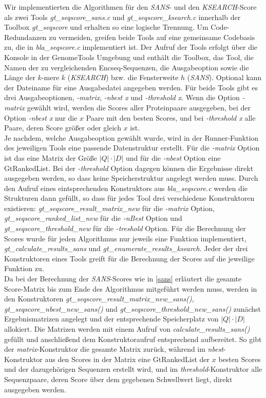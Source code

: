 \documentclass{article}
\begin{document}
Wir implementierten die Algorithmen für den \emph{SANS}- und den \emph{KSEARCH}-Score als zwei Tools \emph{gt\_seqscore\_sans.c} und \emph{gt\_seqscore\_ksearch.c} innerhalb der Toolbox \emph{gt\_seqscore} und erhalten so eine logische Trennung. Um Code-Redundanzen zu vermeiden, greifen beide Tools auf eine gemeinsame Codebasis zu, die in \emph{bla\_seqscore.c} implementiert ist. 
Der Aufruf der Tools erfolgt über die Konsole in der GenomeTools Umgebung und enthält die Toolbox, das Tool, die Namen der zu vergleichenden Encseq-Sequenzen, die 
Ausgabeoption sowie die Länge der $k$-mere $k$ (\emph{KSEARCH}) bzw. die Fensterweite $h$ (\emph{SANS}). Optional kann der Dateiname für eine Ausgabedatei angegeben werden.
Für beide Tools gibt es drei Ausgabeoptionen, \emph{-matrix}, \emph{-nbest x} und \emph{-threshold x}. Wenn die Option \emph{-matrix} gewählt wird, werden die Scores aller Proteinpaare ausgegeben, 
bei der Option \emph{-nbest x} nur die $x$ Paare mit den besten Scores, und bei \emph{-threshold x} alle Paare, deren Score größer oder gleich $x$ ist. \\
Je nachdem, welche Ausgabeoption gewählt wurde, wird in der Runner-Funktion des jeweiligen Tools eine passende Datenstruktur erstellt. 
Für die \emph{-matrix} Option ist das eine Matrix der Größe $|Q|\cdot|D|$ und für die \emph{-nbest} Option eine GtRankedList. 
Bei der \emph{-threshold} Option dagegen können die Ergebnisse direkt ausgegeben werden, so dass keine Speicherstruktur angelegt werden muss. 
Durch den Aufruf eines eintsprechenden Konstruktors aus \emph{bla\_seqscore.c} werden die Strukturen dann gefüllt, so dass für jedes Tool drei verschiedene Konstruktoren existieren:
\emph{gt\_seqscore\_result\_matrix\_new} für die \emph{-matrix} Option, \emph{gt\_seqscore\_ranked\_list\_new} für die \emph{-nBest} Option und \emph{gt\_seqscore\_threshold\_new} für die \emph{-treshold} Option.
Für die Berechnung der Scores wurde für jeden Algorithmus nur jeweils eine Funktion implementiert, \emph{gt\_calculate\_results\_sans} und \emph{gt\_enumerate\_results\_ksearch}. 
Jeder der drei Konstruktoren eines Tools greift für die Berechnung der Scores auf die jeweilige Funktion zu.\\
Da bei der Berechnung der \emph{SANS}-Scores wie in \ref{sans} erläutert die gesamte Score-Matrix bis zum Ende des Algorithmus mitgeführt werden muss, werden in den Kon\-struktoren \emph{gt\_seqscore\_result\_matrix\_new\_sans()}, \emph{gt\_seqscore\_nbest\_new\_sans()} und  \emph{gt\_seqscore\_threshold\_new\_sans()} zunächst Ergebnismatrizen angelegt und der entsprechende Speicherplatz von $|Q|\cdot|D|$ allokiert. Die Matrizen werden mit einem Aufruf von \emph{calculate\_results\_sans()} gefüllt und anschließend dem Konstruktoraufruf entsprechend aufbereitet. So gibt der \emph{matrix}-Konstruktor die gesamte Matrix zurück, während im \emph{nbest}-Konstruktor aus den Scores in der Matrix eine GtRankedList der $x$ besten Scores und der dazugehörigen Sequenzen erstellt wird, und im \emph{threshold}-Konstruktor alle Sequenzpaare, deren Score über dem gegebenen Schwellwert liegt, direkt ausgegeben werden.\\
\end{document}
